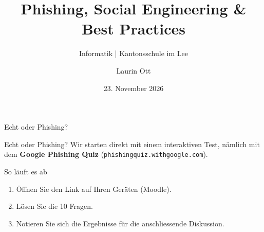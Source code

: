 \documentclass[10pt, aspectratio=169]{beamer}
\title[Phishing \& Social Engineering]{Phishing, Social Engineering \& Best Practices}
\subtitle{Informatik | Kantonsschule im Lee}
\author{Laurin Ott}
\date{23. November 2026}
\begin{document}
\begin{frame}
  \titlepage
\end{frame}

\begin{frame}{Echt oder Phishing?}
  \pause
  \begin{block}{Echt oder Phishing?}
    Wir starten direkt mit einem interaktiven Test, nämlich mit dem \textbf{Google Phishing Quiz} (\texttt{phishingquiz.withgoogle.com}).
  \end{block}
  \vspace{0.8em}
  \pause
  \begin{block}{So läuft es ab}
    \begin{enumerate}
      \item Öffnen Sie den Link auf Ihren Geräten (Moodle).
      \item Lösen Sie die 10 Fragen.
      \item Notieren Sie sich die Ergebnisse für die anschliessende Diskussion.
    \end{enumerate}
  \end{block}
\end{frame}
\end{document}
